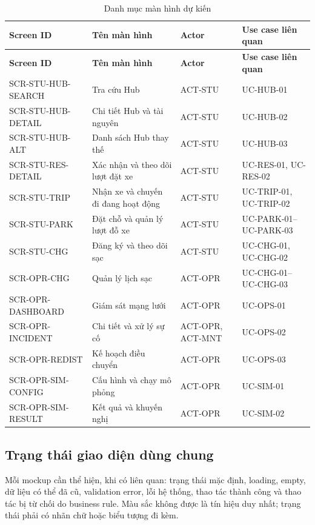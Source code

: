 \begin{longtable}{|L{34mm}|L{45mm}|L{24mm}|L{31mm}|}
  \caption{Danh mục màn hình dự kiến}\label{tab:phase2-screen-catalog}\\
  \hline
  \textbf{Screen ID} & \textbf{Tên màn hình} & \textbf{Actor} & \textbf{Use case liên quan}\\\hline
  \endfirsthead
  \hline
  \textbf{Screen ID} & \textbf{Tên màn hình} & \textbf{Actor} & \textbf{Use case liên quan}\\\hline
  \endhead
  SCR-STU-HUB-SEARCH & Tra cứu Hub & ACT-STU & UC-HUB-01\\\hline
  SCR-STU-HUB-DETAIL & Chi tiết Hub và tài nguyên & ACT-STU & UC-HUB-02\\\hline
  SCR-STU-HUB-ALT & Danh sách Hub thay thế & ACT-STU & UC-HUB-03\\\hline
  SCR-STU-RES-DETAIL & Xác nhận và theo dõi lượt đặt xe & ACT-STU & UC-RES-01, UC-RES-02\\\hline
  SCR-STU-TRIP & Nhận xe và chuyến đi đang hoạt động & ACT-STU & UC-TRIP-01, UC-TRIP-02\\\hline
  SCR-STU-PARK & Đặt chỗ và quản lý lượt đỗ xe & ACT-STU & UC-PARK-01--UC-PARK-03\\\hline
  SCR-STU-CHG & Đăng ký và theo dõi sạc & ACT-STU & UC-CHG-01, UC-CHG-02\\\hline
  SCR-OPR-CHG & Quản lý lịch sạc & ACT-OPR & UC-CHG-01--UC-CHG-03\\\hline
  SCR-OPR-DASHBOARD & Giám sát mạng lưới & ACT-OPR & UC-OPS-01\\\hline
  SCR-OPR-INCIDENT & Chi tiết và xử lý sự cố & ACT-OPR, ACT-MNT & UC-OPS-02\\\hline
  SCR-OPR-REDIST & Kế hoạch điều chuyển & ACT-OPR & UC-OPS-03\\\hline
  SCR-OPR-SIM-CONFIG & Cấu hình và chạy mô phỏng & ACT-OPR & UC-SIM-01\\\hline
  SCR-OPR-SIM-RESULT & Kết quả và khuyến nghị & ACT-OPR & UC-SIM-02\\\hline
\end{longtable}

\subsection{Trạng thái giao diện dùng chung}

Mỗi mockup cần thể hiện, khi có liên quan: trạng thái mặc định, loading, empty, dữ liệu có thể đã cũ, validation error, lỗi hệ thống, thao tác thành công và thao tác bị từ chối do business rule. Màu sắc không được là tín hiệu duy nhất; trạng thái phải có nhãn chữ hoặc biểu tượng đi kèm.

